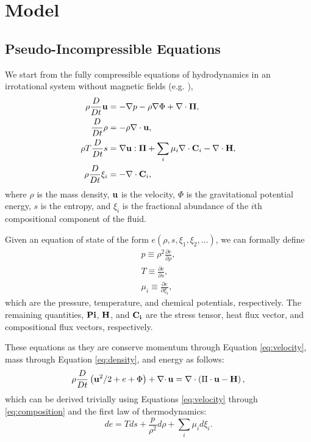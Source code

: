 \section{Model} %
\label{sec:model}

\subsection{Pseudo-Incompressible Equations} %
\label{sub:pseudo}

We start from the fully compressible equations of hydrodynamics in an irrotational system without magnetic fields (e.g. \citet{Braginsky2006}),
\begin{subequations}
	\begin{align}
		\label{eq:velocity}
		\rho\frac{D}{Dt}\mathbf{u}&=-\nabla p-\rho\nabla\Phi+\nabla\cdot\mathbf{\Pi},\\
		\label{eq:density}
		\frac{D}{Dt}\rho&=-\rho\nabla\cdot\mathbf{u},\\
		\label{eq:entropy}
		\rho T \frac{D}{Dt}s&=\nabla\mathbf{u}:\mathbf{\Pi}+\sum_{i}\mu_{i}\nabla\cdot\mathbf{C}_{i}-\nabla\cdot{\mathbf{H}},\\
		\label{eq:composition}
		\rho\frac{D}{Dt}\xi_{i}&=-\nabla\cdot\mathbf{C}_{i},
	\end{align}
\end{subequations}
where $\rho$ is the mass density, $\mathbf{u}$ is the velocity, $\Phi$ is the gravitational potential energy, $s$ is the entropy, and $\xi_{i}$ is the fractional abundance of the $i$th compositional component of the fluid.

Given an equation of state of the form $e(\rho,s,\xi_{1},\xi_{2},\dots)$, we can formally define 
\begin{subequations}
	\begin{align}
		p\equiv\rho^{2}\frac{\partial e}{\partial \rho},\\
		T\equiv\frac{\partial e}{\partial s},\\
		\mu_{i}\equiv\frac{\partial e}{\partial \xi_{i}},
	\end{align}
\end{subequations}
which are the pressure, temperature, and chemical potentials, respectively.
The remaining quantities, $\mathbf{Pi}$, $\mathbf{H}$, and $\mathbf{C_{i}}$ are the stress tensor, heat flux vector, and compositional flux vectors, respectively.

These equations as they are conserve momentum through Equation \ref{eq:velocity}, mass through Equation \ref{eq:density}, and energy as follows:
\begin{equation}
	\rho\frac{D}{Dt}\left(\mathbf{u}^{2}/2+e+\Phi\right)+\nabla\cdotp\mathbf{u}=\nabla\cdot\left(\Pi\cdot\mathbf{u}-\mathbf{H}\right),
\end{equation}
which can be derived trivially using Equations \ref{eq:velocity} through \ref{eq:composition} and the first law of thermodynamics:
\begin{equation}
	\label{eq:firstlaw}
	de=Tds+\frac{p}{\rho^{2}}d\rho+\sum_{i}\mu_{i}d\xi_{i}.
\end{equation}

